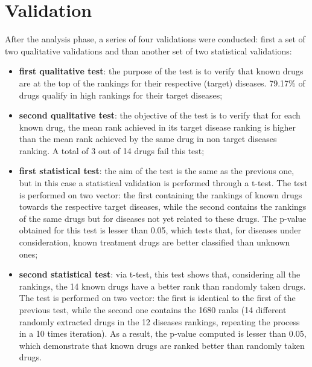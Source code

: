 \section{Validation}
After the analysis phase, a series of four validations were conducted: first a set of two qualitative validations and than another set of two statistical validations:
\begin{itemize}
    \item \textbf{first qualitative test}: the purpose of the test is to verify that known drugs are at the top of the rankings for their respective (target) diseases. 79.17\% of drugs qualify in high rankings for their target diseases;
    \item \textbf{second qualitative test}: the objective of the test is to verify that for each known drug, the mean rank achieved in its target disease ranking is higher than the mean rank achieved by the same drug in non target diseases ranking. A total of 3 out of 14 drugs fail this test; 
    \item \textbf{first statistical test}: the aim of the test is the same as the previous one, but in this case a statistical validation is performed through a t-test.
    The test is performed on two vector: the first containing the rankings of known drugs towards the respective target diseases, while the second contains the rankings of the same drugs but for diseases not yet related to these drugs.
    The p-value obtained for this test is lesser than 0.05, which tests that, for diseases under consideration, known treatment drugs are better classified than unknown ones;
    \item \textbf{second statistical test}: via t-test, this test shows that, considering all the rankings, the 14 known drugs have a better rank than randomly taken drugs.
    The test is performed on two vector: the first is identical to the first of the previous test, while the second one contains the 1680 ranks (14 different randomly extracted drugs in the 12 diseases rankings, repeating the process in a 10 times iteration).
    As a result, the p-value computed is lesser than 0.05, which demonstrate that known drugs are ranked better than randomly taken drugs.
\end{itemize}

